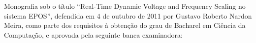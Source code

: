 \documentclass[a4paper]{abnt}
\begin{document}
    \capa
    \folhaderosto

    \setlength{\ABNTsignthickness}{0.4pt}
    \begin{folhadeaprovacao}
        Monografia sob o título
        ``Real-Time Dynamic Voltage and Frequency Scaling no sistema EPOS'', defendida
        em 4 de outubro de 2011 por Gustavo Roberto Nardon Meira, como parte dos requisitos à obtenção
        do grau de Bacharel em Ciência da Computação, e aprovada pela seguinte banca examinadora:
    
    \end{folhadeaprovacao}
       
    


    
        
\end{document}

